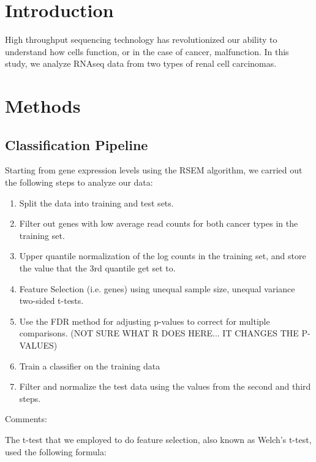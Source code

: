 \section{Introduction}

High throughput sequencing technology has revolutionized our ability to
understand how cells function, or in the case of cancer, malfunction. In this
study, we analyze RNAseq data from two types of renal cell carcinomas. 


\section{Methods}
\subsection{Classification Pipeline}

Starting from gene expression levels using the RSEM algorithm, we carried out
the following steps to analyze our data:

\begin{enumerate}
\item Split the data into training and test sets. 
\item Filter out genes with low average read counts for both cancer types in the training set. 
\item Upper quantile normalization of the log counts in the training set, and store the value that the 3rd quantile get set to. 
\item Feature Selection (i.e. genes) using unequal sample size, unequal variance two-sided t-tests. 
\item Use the FDR method for adjusting p-values to correct for multiple comparisons. (NOT SURE WHAT R DOES HERE... IT CHANGES THE P-VALUES)
\item Train a classifier on the training data
\item Filter and normalize the test data using the values from the second and third steps. 
\end{enumerate}



Comments:

The t-test that we employed to do feature selection, also known as Welch's
t-test, used the following formula:

